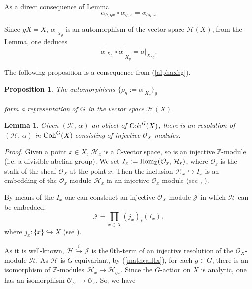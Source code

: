 \documentclass[xypic,amscd,syntonly,amssymb,verbatim,12pt]{amsart}
\theoremstyle{plain}
\newtheorem{Prop}[Thm]{Proposition}
\newtheorem{Lem}[Thm]{Lemma}
\theoremstyle{definition}
\theoremstyle{remark}
\numberwithin{equation}{section}
\begin{document}
\smallskip

As a direct consequence of Lemma
\begin{equation}\label{alphahg}
\alpha_{h,gx}\circ\alpha_{g,x}= \alpha_{hg,x}
\end{equation}


 Since $gX=X$, $\alpha|_{X_g}$ is an automorphism of the vector space ${\mathcal H}(X)$,   from the Lemma, one deduces
 \begin{equation}\label{alphaxhg}
 \alpha|_{X_h}\circ\alpha|_{X_g}=\alpha|_{X_{hg}}.
 \end{equation}
 
 
 The following proposition is a consequence from (\ref{alphaxhg}).


 \begin{Prop}\label{CorRepr}
 The automorphisms
 $\{\rho_g:=\alpha|_{X_g}\}_g$
 
 form a representation of $G$ in the vector space ${\mathcal H}(X)$.
 
\end{Prop}





  \begin{Lem}\label{equivResolution}
  Given $({\mathcal H},\,\alpha)$ an object of ${\rm Coh}^G(X)$, there is an resolution of  $({\mathcal H},\,\alpha)$ in ${\rm Coh}^G(X)$
  consisting of injective ${\mathcal O}_X$-modules.
  \end{Lem}
{\it Proof.} Given a point $x\in X$, ${\mathcal H}_x$ is a
${\mathbb C}$-vector space, so is an injective ${\mathbb
Z}$-module (i.e. a divisible abelian group). We set
 ${I}_x:={\rm Hom}_{\mathbb Z}({\mathcal O}_x,\, {\mathcal H}_x)$, where ${\mathcal O}_x$ is
 the stalk of the sheaf
 ${\mathcal O}_X$ at the point $x$. Then the inclusion
 ${\mathcal H}_x\hookrightarrow { I}_x$ is an embedding  of the ${\mathcal O}_x$-module
 ${\mathcal H}_x$ in an injective
  ${\mathcal O}_x$-module (see  \cite[III.7]{M-L}, \cite[page 123]{R}).

 By means of the $I_x$ one can construct an injective ${\mathcal O}_X$-module ${\mathcal J}$
 in which ${\mathcal H}$ can be embedded.
 $${\mathcal J}=\prod_{x\in X}(j_x)_*(I_x),$$
 where $j_x:\{x\}\hookrightarrow X$ (see \cite[page 207]{Hart}).

 As it is well-known, ${\mathcal H}\overset{i}{\hookrightarrow}{\mathcal J}$ is the $0$th-term of an
 injective resolution of the ${\mathcal O}_X$-module ${\mathcal H}$.
 As ${\mathcal H}$ is $G$-equivariant, by (\ref{mathcalHx}), for each $g\in G$, there is an
 isomorphism of ${\mathbb Z}$-modules ${\mathcal H}_x\to{\mathcal H}_{gx}$. Since the $G$-action on $X$ is analytic, one has an isomorphism ${\mathcal O}_{gx}\to {\mathcal O}_x$. So, we have
 
\end{document}
